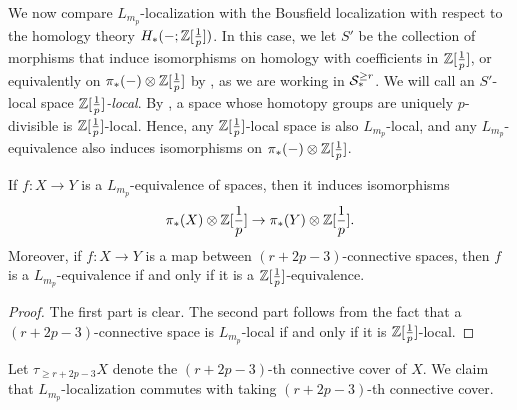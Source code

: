 We now compare $L_{m_p}$-localization with
the Bousfield localization with respect to the homology theory $H_{*}(-;{\mathbb{Z}}[\frac{1}{p}])$.
In this case, we let $S'$ be the collection of morphisms that induce isomorphisms on homology with coefficients in ${\mathbb{Z}}[\frac{1}{p}]$, or equivalently on $\pi_*(-)\otimes {\mathbb{Z}}[\frac{1}{p}]$ by \cite[Proposition 4.3]{Bousfield96}, as we are working in ${\mathcal{S}}^{\geq r}_*$.
We will call an $S'$-local space \emph{${\mathbb{Z}}[\frac{1}{p}]$-local}.
By \cite[Theorem 5.5]{Bousfield96}, 
a space whose homotopy groups are uniquely $p$-divisible is ${\mathbb{Z}}[\frac{1}{p}]$-local.
Hence, any ${\mathbb{Z}}[\frac{1}{p}]$-local space is also $L_{m_p}$-local, and any $L_{m_p}$-equivalence also induces isomorphisms on $\pi_*(-)\otimes {\mathbb{Z}}[\frac{1}{p}]$.

\begin{lemma}
\label{L-equivalence implies Z[1/p]-iso in spaces}
	If $f:X\to Y$ is a $L_{m_{p}}$-equivalence of spaces, then it induces isomorphisms
	$$
	\pi_{*}(X)\otimes {\mathbb{Z}}[\frac{1}{p}]
	\to
	\pi_{*}(Y)\otimes {\mathbb{Z}}[\frac{1}{p}].
	$$
	Moreover, if $f:X\to Y$ is a map between $(r+2p-3)$-connective spaces, then $f$ is a $L_{m_p}$-equivalence if and only if it is a ${\mathbb{Z}}[\frac{1}{p}]$-equivalence.
\end{lemma}
\begin{proof}
    The first part is clear.
    The second part follows from the fact that a $(r+2p-3)$-connective space is $L_{m_p}$-local if and only if it is ${\mathbb{Z}}[\frac{1}{p}]$-local.
\end{proof}

Let $\tau_{\geq r+2p-3}X$ denote the $(r+2p-3)$-th connective cover of $X$.
We claim that $L_{m_p}$-localization commutes with taking $(r+2p-3)$-th connective cover.

